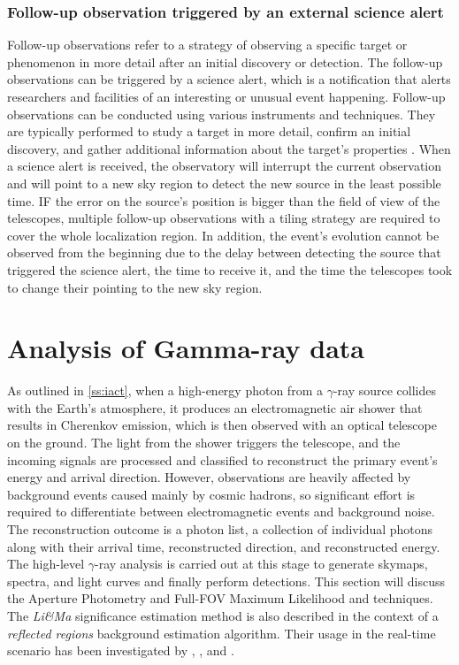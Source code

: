 \subsubsection{Follow-up observation triggered by an external science alert}
\label{s:follow-up-observation}
Follow-up observations refer to a strategy of observing a specific target or phenomenon in more detail after an initial discovery or detection. The follow-up observations can be triggered by a science alert, which is a notification that alerts researchers and facilities of an interesting or unusual event happening. Follow-up observations can be conducted using various instruments and techniques. They are typically performed to study a target in more detail, confirm an initial discovery, and gather additional information about the target's properties \cite{ScienceWithCherenkovTelescopeArray2018}. When a science alert is received, the observatory will interrupt the current observation and will point to a new sky region to detect the new source in the least possible time. IF the error on the source's position is bigger than the field of view of the telescopes,  multiple follow-up observations with a tiling strategy \cite{bulgarelli2015on} are required to cover the whole localization region. In addition, the event's evolution cannot be observed from the beginning due to the delay between detecting the source that triggered the science alert, the time to receive it, and the time the telescopes took to change their pointing to the new sky region. 



\section{Analysis of Gamma-ray data}
\label{s:gamma-ray-data-analysis}
As outlined in \autoref{ss:iact}, when a high-energy photon from a $\gamma$-ray source collides with the Earth's atmosphere, it produces an electromagnetic air shower that results in Cherenkov emission, which is then observed with an optical telescope on the ground. The light from the shower triggers the telescope, and the incoming signals are processed and classified to reconstruct the primary event's energy and arrival direction. However, observations are heavily affected by background events caused mainly by cosmic hadrons, so significant effort is required to differentiate between electromagnetic events and background noise. The reconstruction outcome is a photon list, a collection of individual photons along with their arrival time, reconstructed direction, and reconstructed energy. The high-level $\gamma$-ray analysis is carried out at this stage to generate skymaps, spectra, and light curves and finally perform detections. This section will discuss the Aperture Photometry and Full-FOV Maximum Likelihood and  techniques. The \textit{Li\&Ma} significance estimation method is also described in the context of a \textit{reflected regions} background estimation algorithm. Their usage in the real-time scenario has been investigated by \cite{tampieri2020real}, \cite{di2020detection}, and \cite{di2021detection}. 

